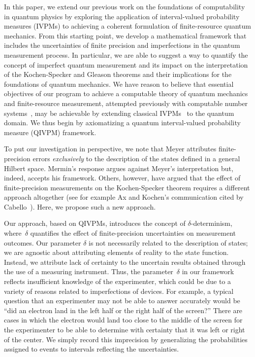 \documentclass[english,reprint, aps, prl,superscriptaddress, showpacs,
showkeys, longbibliography, amsmath, amssymb, floatfix]{revtex4-1}
\theoremstyle{plain}
\theoremstyle{definition}
\begin{document}
In this paper, we extend our previous work on the
foundations of computability in quantum physics by exploring the
application of interval-valued probability measures (IVPMs) to
achieving a coherent formulation of finite-resource quantum mechanics.
From this starting point, we develop a mathematical framework that includes the
uncertainties of finite precision and imperfections in the quantum
measurement process.  In particular, we are able to suggest a way to quantify
the concept of imperfect quantum measurement and its impact on the interpretation of
the Kochen-Specker and Gleason theorems and their implications for the
foundations of quantum mechanics.  We have reason to believe that
essential objectives of our program to achieve a computable theory of
quantum mechanics and finite-resource measurement, attempted
previously with computable number
systems~\cite{usat,geometry2013apsrev4,DQT2014}, may be achievable by
extending classical IVPMs~\cite{JamisonLodwick2004} to the quantum
domain.  We thus begin by axiomatizing a quantum interval-valued
probability measure (QIVPM) framework.

To put our investigation in perspective, we note that Meyer attributes
finite-precision errors \emph{exclusively} to the description of the
states defined in a general Hilbert space. Mermin's response argues
against Meyer's interpretation but, indeed,  accepts his framework. Others,
however, have argued that the effect of finite-precision measurements
on the Kochen-Specker theorem requires a different approach altogether
(see for example Ax and Kochen's communication cited by
Cabello~\cite{Cabello2002}). Here, we propose such a new approach. 

Our approach, based on QIVPMs, introduces the concept of $\delta$-determinism,
where~$\delta$ quantifies the effect of finite-precision uncertainties
on measurement outcomes.  Our parameter $\delta$ is not necessarily
related to the description of states; we are agnostic about
attributing elements of reality to the state function. Instead, we
attribute lack of certainty to the uncertain results obtained through
the use of a measuring instrument.  Thus, the parameter~$\delta$ in
our framework reflects insufficient knowledge of the experimenter,
which could be due to a variety of reasons related to imperfections of
devices. For example, a typical question that an experimenter may not
be able to answer accurately would be ``did an electron land in the
left half or the right half of the screen?''  There are cases in which
the electron would land too close to the middle of the screen for the
experimenter to be able to determine with certainty that it was left
or right of the center.  We simply record this imprecision by
generalizing the probabilities assigned to events to intervals reflecting the
uncertainties.
\end{document}
